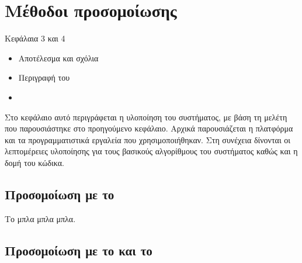 \chapter{Μέθοδοι προσομοίωσης}
Κεφάλαια 3 και 4
\begin{itemize}
\item Αποτέλεσμα και σχόλια
\item Περιγραφή του 
\item {}
\end{itemize}
Στο κεφάλαιο αυτό περιγράφεται η υλοποίηση του συστήματος, με βάση
τη μελέτη που παρουσιάστηκε στο προηγούμενο κεφάλαιο. Αρχικά
παρουσιάζεται η πλατφόρμα και τα προγραμματιστικά εργαλεία που
χρησιμοποιήθηκαν. Στη συνέχεια δίνονται οι λεπτομέρειες υλοποίησης
για τους βασικούς αλγορίθμους του συστήματος καθώς και η δομή του
κώδικα.

\section{Προσομοίωση με το }
Το  μπλα μπλα μπλα.

\section{Προσομοίωση με το  και το }

